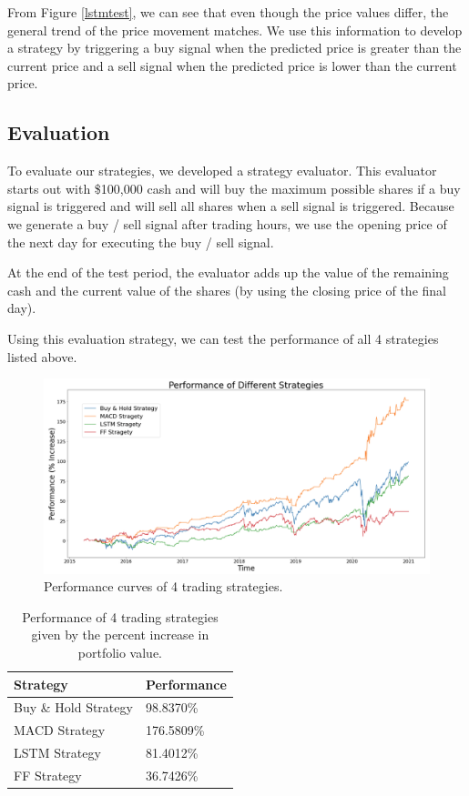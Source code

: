 \documentclass[10pt]{article}
\begin{document}
From Figure \ref{lstmtest}, we can see that even though the price values differ, the general trend of the price movement matches. We use this information to develop a strategy by triggering a buy signal when the predicted price is greater than the current price and a sell signal when the predicted price is lower than the current price.


\subsection{Evaluation}

To evaluate our strategies, we developed a strategy evaluator. This evaluator starts out with \$100,000 cash and will buy the maximum possible shares if a buy signal is triggered and will sell all shares when a sell signal is triggered. Because we generate a buy / sell signal after trading hours, we use the opening price of the next day for executing the buy / sell signal.

At the end of the test period, the evaluator adds up the value of the remaining cash and the current value of the shares (by using the closing price of the final day).

Using this evaluation strategy, we can test the performance of all 4 strategies listed above.

\begin{figure}[H]
\centering
\includegraphics[width=\textwidth]{perf}
\caption{Performance curves of 4 trading strategies.}
\label{perf}
\end{figure}

\begin{table}[H]
\centering
\begin{tabular}{| l | l |} 
\hline
Strategy & Performance \\
\hline
Buy \& Hold Strategy & 98.8370\% \\
MACD Strategy & 176.5809\% \\
LSTM Strategy & 81.4012\% \\
FF Strategy & 36.7426\% \\
\hline
\end{tabular}
\caption{Performance of 4 trading strategies given by the percent increase in portfolio value.}
\label{perftable}
\end{table}
\end{document}
